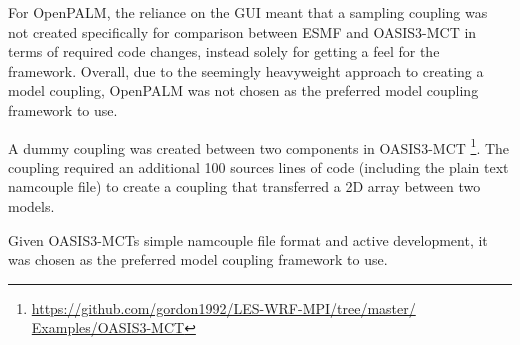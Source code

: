 For OpenPALM, the reliance on the GUI meant that a sampling coupling was not
created specifically for comparison between ESMF and OASIS3-MCT in terms of
required code changes, instead solely for getting a feel for the framework.
Overall, due to the seemingly heavyweight approach to creating a model coupling,
OpenPALM was not chosen as the preferred model coupling framework to use.

A dummy coupling was created between two components in OASIS3-MCT
\footnote{\url{https://github.com/gordon1992/LES-WRF-MPI/tree/master/
Examples/OASIS3-MCT}}. The coupling required an additional 100 sources lines of
code (including the plain text namcouple file) to create a coupling that
transferred a 2D array between two models.

Given OASIS3-MCTs simple namcouple file format and active development, it was
chosen as the preferred model coupling framework to use.
